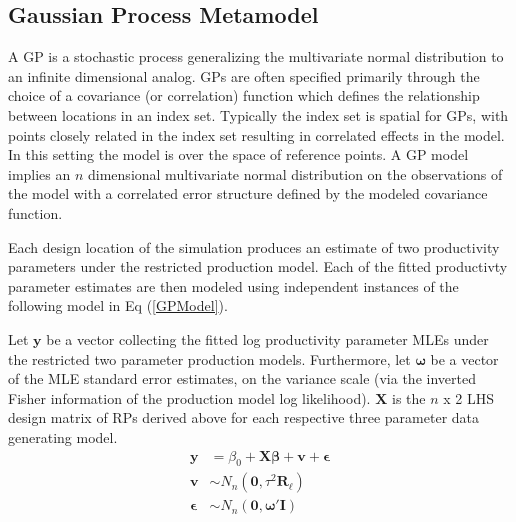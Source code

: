 \documentclass[12pt]{article}
\begin{document}
%  
%
%



%



%
\subsection{Gaussian Process Metamodel}
%

%
A GP is a stochastic process generalizing the multivariate normal distribution 
to an infinite dimensional analog. GPs are often specified primarily through the
choice of a covariance (or correlation) function which defines the relationship 
between locations in an index set. Typically the index set is spatial for GPs, 
with points closely related in the index set resulting in correlated effects in 
the model. In this setting the model is over the space of reference points. A GP 
model implies an $n$ dimensional multivariate normal distribution on the 
observations of the model with a correlated error structure defined by the 
modeled covariance function.

%
Each design location of the simulation produces an estimate of two productivity 
parameters under the restricted production model. Each of the fitted 
productivty parameter estimates are then modeled using independent instances of 
the following model in Eq (\ref{GPModel}).

%
Let $\textbf{y}$ be a vector collecting the fitted log productivity parameter MLEs under 
the restricted two parameter production models. Furthermore, let $\bm{\omega}$ 
be a vector of the MLE standard error estimates, on the variance scale (via the inverted Fisher 
information of the production model log likelihood).  
%
$\bm{X}$ is the $n$ x 2 LHS design matrix of RPs derived above for each respective 
three parameter data generating model. 
\begin{align} \label{GPModel}
	\textbf{y} &= \beta_0 + \bm{X}\bm{\beta} + \bm{v} + \bm{\epsilon} \nonumber \\
	\bm{v} &\sim N_n(\bm{0}, \tau^2 \bm{R_{\ell}}) \\
	\bm{\epsilon} &\sim N_n(\bm{0}, \bm{\omega}'\bm{I}) \nonumber
\end{align}
\end{document}
